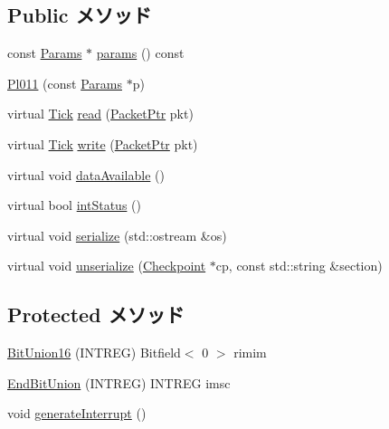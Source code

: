 \subsection*{Public メソッド}
\begin{DoxyCompactItemize}
\item 
const \hyperlink{classPl011_a7c50120eadc91b7f8522e0e4f1398769}{Params} $\ast$ \hyperlink{classPl011_acd3c3feb78ae7a8f88fe0f110a718dff}{params} () const 
\item 
\hyperlink{classPl011_ade5d2e96a72a0f063620be79a21dd12e}{Pl011} (const \hyperlink{classPl011_a7c50120eadc91b7f8522e0e4f1398769}{Params} $\ast$p)
\item 
virtual \hyperlink{base_2types_8hh_a5c8ed81b7d238c9083e1037ba6d61643}{Tick} \hyperlink{classPl011_a613ec7d5e1ec64f8d21fec78ae8e568e}{read} (\hyperlink{classPacket}{PacketPtr} pkt)
\item 
virtual \hyperlink{base_2types_8hh_a5c8ed81b7d238c9083e1037ba6d61643}{Tick} \hyperlink{classPl011_a4cefab464e72b5dd42c003a0a4341802}{write} (\hyperlink{classPacket}{PacketPtr} pkt)
\item 
virtual void \hyperlink{classPl011_a603e184f4f31471b76cff54303262aa8}{dataAvailable} ()
\item 
virtual bool \hyperlink{classPl011_a57f9c26cb4108beccb35bb1938990932}{intStatus} ()
\item 
virtual void \hyperlink{classPl011_a53e036786d17361be4c7320d39c99b84}{serialize} (std::ostream \&os)
\item 
virtual void \hyperlink{classPl011_af22e5d6d660b97db37003ac61ac4ee49}{unserialize} (\hyperlink{classCheckpoint}{Checkpoint} $\ast$cp, const std::string \&section)
\end{DoxyCompactItemize}
\subsection*{Protected メソッド}
\begin{DoxyCompactItemize}
\item 
\hyperlink{classPl011_a0afce67c547c76c56a13cfc7323fe124}{BitUnion16} (INTREG) Bitfield$<$ 0 $>$ rimim
\item 
\hyperlink{classPl011_a0b479d35b44ed7045fe0849fc06ee395}{EndBitUnion} (INTREG) INTREG imsc
\item 
void \hyperlink{classPl011_ab251ef5c4d9e1f0239542a9d8aa0dc3e}{generateInterrupt} ()
\end{DoxyCompactItemize}
